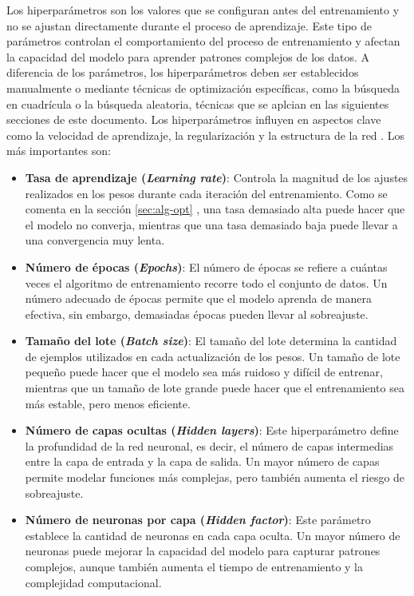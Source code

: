 Los hiperparámetros son los valores que se configuran antes del entrenamiento y no se ajustan directamente durante el proceso de aprendizaje. Este tipo de parámetros controlan el comportamiento del proceso de entrenamiento y afectan la capacidad del modelo para aprender patrones complejos de los datos. A diferencia de los parámetros, los hiperparámetros deben ser establecidos manualmente o mediante técnicas de optimización específicas, como la búsqueda en cuadrícula o la búsqueda aleatoria, técnicas que se aplcian en las siguientes secciones de este documento. Los hiperparámetros influyen en aspectos clave como la velocidad de aprendizaje, la regularización y la estructura de la red \cite{chollet2018deep}. Los más importantes son:

\begin{itemize}

    \item \textbf{Tasa de aprendizaje (\textit{Learning rate})}: Controla la magnitud de los ajustes realizados en los pesos durante cada iteración del entrenamiento. Como se comenta en la sección \ref{sec:alg-opt} , una tasa demasiado alta puede hacer que el modelo no converja, mientras que una tasa demasiado baja puede llevar a una convergencia muy lenta.
    
    \item \textbf{Número de épocas (\textit{Epochs})}: El número de épocas se refiere a cuántas veces el algoritmo de entrenamiento recorre todo el conjunto de datos. Un número adecuado de épocas permite que el modelo aprenda de manera efectiva, sin embargo, demasiadas épocas pueden llevar al sobreajuste.
    
    \item \textbf{Tamaño del lote (\textit{Batch size})}: El tamaño del lote determina la cantidad de ejemplos utilizados en cada actualización de los pesos. Un tamaño de lote pequeño puede hacer que el modelo sea más ruidoso y difícil de entrenar, mientras que un tamaño de lote grande puede hacer que el entrenamiento sea más estable, pero menos eficiente.
    
    \item \textbf{Número de capas ocultas (\textit{Hidden layers})}: Este hiperparámetro define la profundidad de la red neuronal, es decir, el número de capas intermedias entre la capa de entrada y la capa de salida. Un mayor número de capas permite modelar funciones más complejas, pero también aumenta el riesgo de sobreajuste.
    
    \item \textbf{Número de neuronas por capa (\textit{Hidden factor})}: Este parámetro establece la cantidad de neuronas en cada capa oculta. Un mayor número de neuronas puede mejorar la capacidad del modelo para capturar patrones complejos, aunque también aumenta el tiempo de entrenamiento y la complejidad computacional.
\end{itemize}



